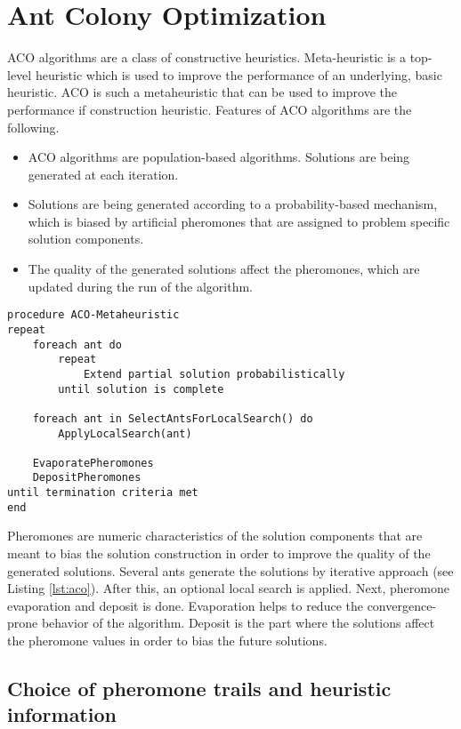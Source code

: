 \section{Ant Colony Optimization}

ACO algorithms are a class of constructive heuristics. Meta-heuristic is a top-level heuristic which is used to improve the performance of an underlying, basic heuristic. ACO is such a metaheuristic that can be used to improve the performance if construction heuristic. Features of ACO algorithms are the following.

\begin{itemize}
\item ACO algorithms are population-based algorithms. Solutions are being generated at each iteration.
\item Solutions are being generated according to a probability-based mechanism, which is biased by artificial pheromones that are assigned to problem specific solution components.
\item The quality of the generated solutions affect the pheromones, which are updated during the run of the algorithm.
\end{itemize}


\begin{minipage}[c, breaklines=true]{0.95\textwidth}
\begin{lstlisting}[caption={General ACO pseudo-code}, label={lst:aco}]
procedure ACO-Metaheuristic
repeat
	foreach ant do
		repeat
			Extend partial solution probabilistically
		until solution is complete
	
	foreach ant in SelectAntsForLocalSearch() do
		ApplyLocalSearch(ant)
	
	EvaporatePheromones
	DepositPheromones
until termination criteria met
end
\end{lstlisting}
\end{minipage}

Pheromones are numeric characteristics of the solution components that are meant to bias the solution construction in order to improve the quality of the generated solutions. Several ants generate the solutions by iterative approach (see Listing \ref{lst:aco}). After this, an optional local search is applied. Next, pheromone evaporation and deposit is done. Evaporation helps to reduce the convergence-prone behavior of the algorithm. Deposit is the part where the solutions affect the pheromone values in order to bias the future solutions.

\subsection{Choice of pheromone trails and heuristic information}

